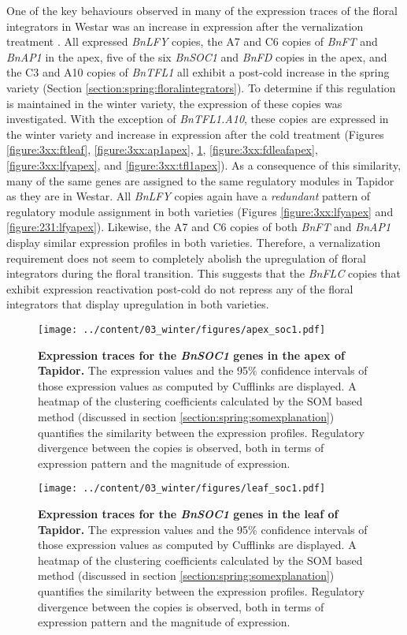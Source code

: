 \documentclass[12pt,]{book}
\begin{document}
One of the key behaviours observed in many of the expression traces of
the floral integrators in Westar was an increase in expression after the
vernalization treatment . All expressed \emph{BnLFY} copies, the A7 and
C6 copies of \emph{BnFT} and \emph{BnAP1} in the apex, five of the six
\emph{BnSOC1} and \emph{BnFD} copies in the apex, and the C3 and A10
copies of \emph{BnTFL1} all exhibit a post-cold increase in the spring
variety (Section \ref{section:spring:floralintegrators}). To determine
if this regulation is maintained in the winter variety, the expression
of these copies was investigated. With the exception of
\emph{BnTFL1.A10}, these copies are expressed in the winter variety and
increase in expression after the cold treatment (Figures
\ref{figure:3xx:ftleaf}, \ref{figure:3xx:ap1apex},
\ref{figure:3xx:soc1apex}, \ref{figure:3xx:fdleafapex},
\ref{figure:3xx:lfyapex}, and \ref{figure:3xx:tfl1apex}). As a
consequence of this similarity, many of the same genes are assigned to
the same regulatory modules in Tapidor as they are in Westar. All
\emph{BnLFY} copies again have a \emph{redundant} pattern of regulatory
module assignment in both varieties (Figures \ref{figure:3xx:lfyapex}
and \ref{figure:231:lfyapex}). Likewise, the A7 and C6 copies of both
\emph{BnFT} and \emph{BnAP1} display similar expression profiles in both
varieties. Therefore, a vernalization requirement does not seem to
completely abolish the upregulation of floral integrators during the
floral transition. This suggests that the \emph{BnFLC} copies that
exhibit expression reactivation post-cold do not repress any of the
floral integrators that display upregulation in both varieties.

\begin{figure}[htbp]
\centering
\texttt{[image: ../content/03\_winter/figures/apex\_soc1.pdf]}
\caption{\textbf{Expression traces for the \emph{BnSOC1} genes in the
apex of Tapidor.} The expression values and the 95\% confidence
intervals of those expression values as computed by Cufflinks are
displayed. A heatmap of the clustering coefficients calculated by the
SOM based method (discussed in section
\ref{section:spring:somexplanation}) quantifies the similarity between
the expression profiles. Regulatory divergence between the copies is
observed, both in terms of expression pattern and the magnitude of
expression.}\label{figure:3xx:soc1apex}
\end{figure}

\begin{figure}[htbp]
\centering
\texttt{[image: ../content/03\_winter/figures/leaf\_soc1.pdf]}
\caption{\textbf{Expression traces for the \emph{BnSOC1} genes in the
leaf of Tapidor.} The expression values and the 95\% confidence
intervals of those expression values as computed by Cufflinks are
displayed. A heatmap of the clustering coefficients calculated by the
SOM based method (discussed in section
\ref{section:spring:somexplanation}) quantifies the similarity between
the expression profiles. Regulatory divergence between the copies is
observed, both in terms of expression pattern and the magnitude of
expression.}\label{figure:3xx:soc1leaf}
\end{figure}
\end{document}
